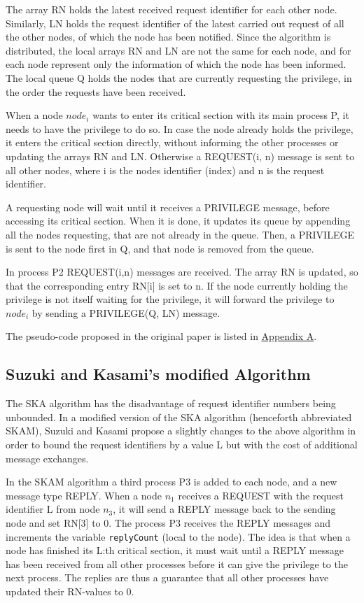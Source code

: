 \documentclass[a4paper,12pt]{llncs}
\begin{document}
The array RN holds the latest received request identifier for each other node. Similarly, LN holds the request identifier of the latest carried out request of all the other nodes, of which the node has been notified. Since the algorithm is distributed, the local arrays RN and LN are not the same for each node, and for each node represent only the information of which the node has been informed.
The local queue Q holds the nodes that are currently requesting the privilege, in the order the requests have been received.


When a node $node_i$ wants to enter its critical section with its main process P, it needs to have the privilege to do so. In case the node already holds the privilege, it enters the critical section directly, without informing the other processes or updating the arrays RN and LN. Otherwise a REQUEST(i, n) message is sent to all other nodes, where i is the nodes identifier (index) and n is the request identifier.

A requesting node will wait until it receives a PRIVILEGE message, before accessing its critical section. When it is done, it updates its queue by appending all the nodes requesting, that are not already in the queue. Then, a PRIVILEGE is sent to the node first in Q, and that node is removed from the queue.

In process P2 REQUEST(i,n) messages are received. The array RN is updated, so that the corresponding entry RN[i] is set to n. If the node currently holding the privilege is not itself waiting for the privilege, it will forward the privilege to $node_i$ by sending a PRIVILEGE(Q, LN) message.

The pseudo-code proposed in the original paper is listed in \hyperref[SKA]{Appendix A}.

\subsection{Suzuki and Kasami's modified Algorithm}
The SKA algorithm has the disadvantage of request identifier numbers being unbounded. In a modified version of the SKA algorithm (henceforth abbreviated SKAM), Suzuki and Kasami propose a slightly changes to the above algorithm in order to bound the request identifiers by a value L but with the cost of additional message exchanges.

In the SKAM algorithm a third process P3 is added to each node, and a new message type REPLY. When a node $n_1$ receives a REQUEST with the request identifier L from node $n_3$, it will send a REPLY message back to the sending node and set RN[3] to 0. The process P3 receives the REPLY messages and increments the variable \texttt{replyCount} (local to the node). The idea is that when a node has finished its L:th critical section, it must wait until a REPLY message has been received from all other processes before it can give the privilege to the next process. The replies are thus a guarantee that all other processes have updated their RN-values to 0.
\end{document}
